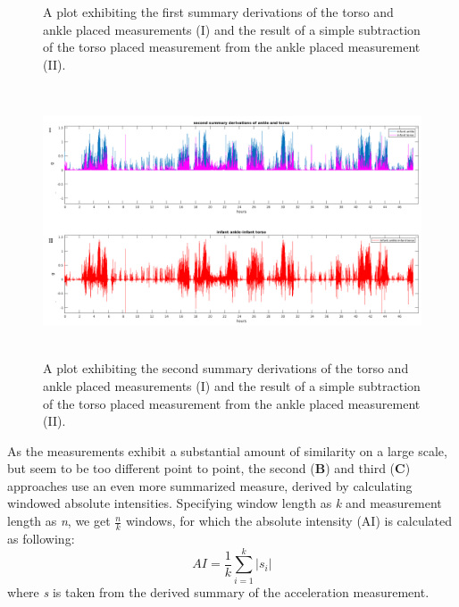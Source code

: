\documentclass{article}
\begin{document}
{\begin{figure}[h!]
\caption{A plot exhibiting the first summary derivations of the torso and ankle placed measurements (I) and the result of a simple subtraction of the torso placed measurement from the ankle placed measurement (II).}
\end{figure}
\begin{figure}[h!]
\includegraphics[width=15cm, height=8cm]{bandpassJustSummary_and_A.png}
\caption{A plot exhibiting the second summary derivations of the torso and ankle placed measurements (I) and the result of a simple subtraction of the torso placed measurement from the ankle placed measurement (II).}
\end{figure}
\newpage
As the measurements exhibit a substantial amount of similarity on a large scale, but seem to be too different point to point, the second (\textbf{B}) and third (\textbf{C}) approaches use an even more summarized measure, derived by calculating windowed absolute intensities. Specifying window length as \textit{k} and measurement length as \textit{n}, we get  \( \frac{n}{k} \)  windows, for which the absolute intensity (AI) is calculated as following:
\begin{displaymath}AI=\frac{1}{k}\sum_{i=1}^{k}|s_i|\end{displaymath} where \textit{s} is taken from the derived summary of the acceleration measurement.\\
}
\end{document}
